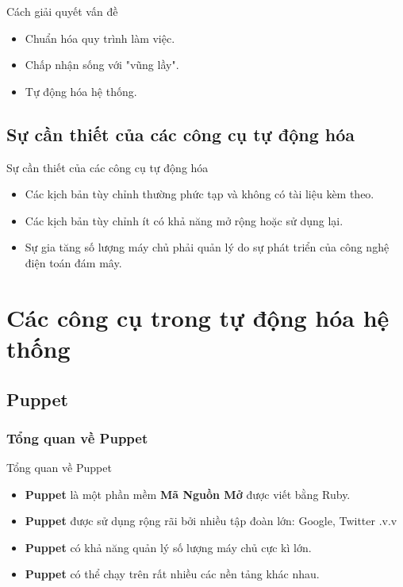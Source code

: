 \documentclass[14pt]{beamer}
\begin{document}
\begin{frame}{Cách giải quyết vấn đề}
\renewcommand{\baselinestretch}{1.50}\normalsize
  \begin{itemize}
    \item \Large Chuẩn hóa quy trình làm việc.
    \pause
    \item \Large Chấp nhận sống với "vũng lầy".
    \pause
    \item \Large Tự động hóa hệ thống.
  \end{itemize}
\renewcommand{\baselinestretch}{1.0}\normalsize
\end{frame}

\subsection{Sự cần thiết của các công cụ tự động hóa}
\begin{frame}{Sự cần thiết của các công cụ tự động hóa}
  \begin{itemize}
    \item Các kịch bản tùy chỉnh thường phức tạp và không có tài liệu kèm theo.
    \pause
    \item Các kịch bản tùy chỉnh ít có khả năng mở rộng hoặc sử dụng lại.
    \pause
    \item Sự gia tăng số lượng máy chủ phải quản lý do sự phát triển của công nghệ điện toán đám mây.
  \end{itemize}
\end{frame}

\section{Các công cụ trong tự động hóa hệ thống}
\subsection{Puppet}
\subsubsection*{Tổng quan về Puppet}
\begin{frame}{Tổng quan về Puppet}
  \begin{itemize}
    \item \textbf{Puppet} là một phần mềm \textbf{Mã Nguồn Mở} được viết bằng Ruby.
    \pause
    \item \textbf{Puppet} được sử dụng rộng rãi bởi nhiều tập đoàn lớn: Google, Twitter .v.v
    \pause
    \item \textbf{Puppet} có khả năng quản lý số lượng máy chủ cực kì lớn.
    \pause
    \item \textbf{Puppet} có thể chạy trên rất nhiều các nền tảng khác nhau.
  \end{itemize}
\end{frame}
\end{document}
